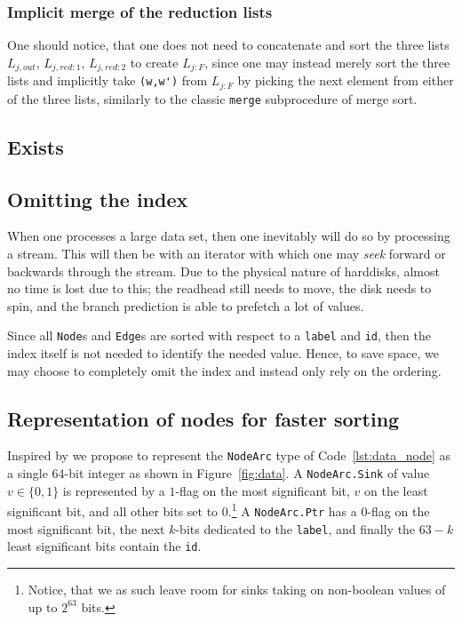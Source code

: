 
\subsubsection{Implicit merge of the reduction lists}
One should notice, that one does not need to concatenate and sort the three
lists $L_{j,\mathit{out}}$, $L_{j,\mathit{red:}1}$, $L_{j,\mathit{red:}2}$ to
create $L_{j:F}$, since one may instead merely sort the three lists and
implicitly take \lstinline{(w,w')} from $L_{j:F}$ by picking the next element
from either of the three lists, similarly to the classic \lstinline{merge}
subprocedure of merge sort.

\subsection{Exists}


\subsection{Omitting the index} \label{sec:optimisations__no_index}
When one processes a large data set, then one inevitably will do so by
processing a stream. This will then be with an iterator with which one may
\emph{seek} forward or backwards through the stream. Due to the physical nature
of harddisks, almost no time is lost due to this; the readhead still needs to
move, the disk needs to spin, and the branch prediction is able to prefetch a
lot of values.

Since all \lstinline{Node}s and \lstinline{Edge}s are sorted with respect to a
\lstinline{label} and \lstinline{id}, then the index itself is not needed to
identify the needed value. Hence, to save space, we may choose to completely
omit the index and instead only rely on the ordering.

\subsection{Representation of nodes for faster sorting}
Inspired by \cite{Dijk16} we propose to represent the \lstinline{NodeArc} type
of Code~\ref{lst:data_node} as a single 64-bit integer as shown in
Figure~\ref{fig:data}. A \lstinline{NodeArc.Sink} of value $v \in \{0,1\}$ is
represented by a $1$-flag on the most significant bit, $v$ on the least
significant bit, and all other bits set to $0$.\footnote{Notice, that we as such
  leave room for sinks taking on non-boolean values of up to $2^{63}$ bits.} A
\lstinline{NodeArc.Ptr} has a $0$-flag on the most significant bit, the next
$k$-bits dedicated to the \lstinline{label}, and finally the $63-k$ least
significant bits contain the \lstinline{id}.

